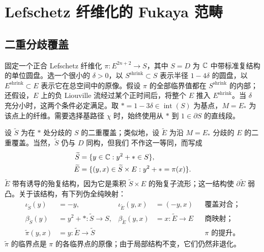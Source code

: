 \section{Lefschetz 纤维化的 Fukaya 范畴}\label{sec:18}\label{section:18}
\subsection{二重分歧覆盖}\label{sec:18a}
固定一个正合 Lefschetz 纤维化 $\pi:E^{2n+2}\to S$，其中 $S=D$ 为 $\mathbb C$ 中带标准复结构的单位圆盘。选一个很小的 $\delta>0$，以 $S^{\mathrm{shrink}}\subset S$ 表示半径 $1-4\delta$ 的圆盘，以 $E^{\mathrm{shrink}}\subset E$ 表示它在总空间中的原像。假设 $\pi$ 的全部临界值都在 $S^{\mathrm{shrink}}$ 的内部；还假设，$E$ 上的负 Liouville 流经过某个正时间后，将整个 $E$ 推入 $E^{\mathrm{shrink}}$。当 $\delta$ 充分小时，这两个条件必定满足。取 $*=1-3\delta\in\operatorname{int}(S)$ 为基点，$M=E_*$ 为该点上的纤维。需要选择基路径 $\chi$ 时，始终使用从 $*$ 到 $1\in\partial S$ 的直线段。

设 $\widetilde S$ 为在 $*$ 处分歧的 $S$ 的二重覆盖；类似地，设 $\widetilde E$ 为沿 $M=E_*$ 分歧的 $E$ 的二重覆盖。当然，$\widetilde S$ 仍与 $D$ 同构，但我们
不作这一等同，而写成
\begin{equation}\label{eq:18.1}
\begin{aligned}
\widetilde S&=\{y\in\mathbb C:y^2+*\in S\},\\
\widetilde E&=\{(y,x)\in\widetilde S\times E:y^2+*=\pi(x)\}.
\end{aligned}
\end{equation}
$\widetilde E$ 带有诱导的殆复结构，因为它是乘积 $\widetilde S\times E$ 的殆复子流形；这一结构使 $\partial\widetilde E$ 弱凸。关于该结构，有下列伪全纯映射：
\[
\begin{aligned}
\iota_{\widetilde S}(y)&=-y,&\iota_{\widetilde E}(y,x)&=(-y,x)&&\text{覆盖对合；}\\
\beta_{\widetilde S}(y)&=y^2+*:\widetilde S\to S,&\beta_{\widetilde E}(y,x)&=x:\widetilde E\to E&&\text{商映射；}\\
\widetilde\pi(y,x)&=y:\widetilde E\to\widetilde S&&&&\text{$\pi$ 的提升。}
\end{aligned}
\]
$\widetilde\pi$ 的临界点是 $\pi$ 的各临界点的原像；由于局部结构不变，它们仍然非退化。

